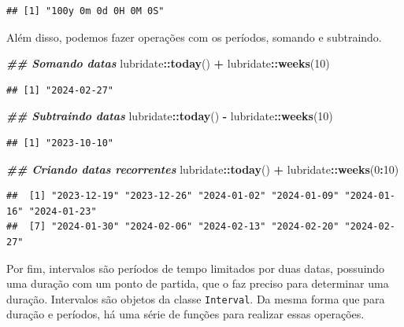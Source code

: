 \documentclass[
]{article}
\newenvironment{Shaded}{\begin{snugshade}}{\end{snugshade}}
\newcommand{\DecValTok}[1]{\textcolor[rgb]{0.00,0.00,0.81}{#1}}
\newcommand{\DocumentationTok}[1]{\textcolor[rgb]{0.56,0.35,0.01}{\textbf{\textit{#1}}}}
\newcommand{\FunctionTok}[1]{\textcolor[rgb]{0.13,0.29,0.53}{\textbf{#1}}}
\newcommand{\NormalTok}[1]{#1}
\newcommand{\SpecialCharTok}[1]{\textcolor[rgb]{0.81,0.36,0.00}{\textbf{#1}}}
\begin{document}
\begin{verbatim}
## [1] "100y 0m 0d 0H 0M 0S"
\end{verbatim}

Além disso, podemos fazer operações com os períodos, somando e subtraindo.

\begin{Shaded}
\begin{Highlighting}[]
\DocumentationTok{\#\# Somando datas}
\NormalTok{lubridate}\SpecialCharTok{::}\FunctionTok{today}\NormalTok{() }\SpecialCharTok{+}\NormalTok{ lubridate}\SpecialCharTok{::}\FunctionTok{weeks}\NormalTok{(}\DecValTok{10}\NormalTok{)}
\end{Highlighting}
\end{Shaded}

\begin{verbatim}
## [1] "2024-02-27"
\end{verbatim}

\begin{Shaded}
\begin{Highlighting}[]
\DocumentationTok{\#\# Subtraindo datas}
\NormalTok{lubridate}\SpecialCharTok{::}\FunctionTok{today}\NormalTok{() }\SpecialCharTok{{-}}\NormalTok{ lubridate}\SpecialCharTok{::}\FunctionTok{weeks}\NormalTok{(}\DecValTok{10}\NormalTok{)}
\end{Highlighting}
\end{Shaded}

\begin{verbatim}
## [1] "2023-10-10"
\end{verbatim}

\begin{Shaded}
\begin{Highlighting}[]
\DocumentationTok{\#\# Criando datas recorrentes}
\NormalTok{lubridate}\SpecialCharTok{::}\FunctionTok{today}\NormalTok{() }\SpecialCharTok{+}\NormalTok{ lubridate}\SpecialCharTok{::}\FunctionTok{weeks}\NormalTok{(}\DecValTok{0}\SpecialCharTok{:}\DecValTok{10}\NormalTok{)}
\end{Highlighting}
\end{Shaded}

\begin{verbatim}
##  [1] "2023-12-19" "2023-12-26" "2024-01-02" "2024-01-09" "2024-01-16" "2024-01-23"
##  [7] "2024-01-30" "2024-02-06" "2024-02-13" "2024-02-20" "2024-02-27"
\end{verbatim}

Por fim, intervalos são períodos de tempo limitados por duas datas, possuindo uma duração com um ponto de partida, que o faz preciso para determinar uma duração. Intervalos são objetos da classe \texttt{Interval}. Da mesma forma que para duração e períodos, há uma série de funções para realizar essas operações.
\end{document}

